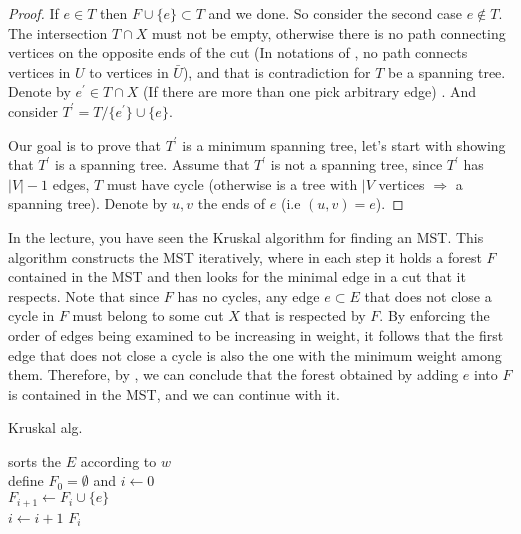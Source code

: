 \begin{proof}
  If $e \in T$ then $F \cup \{ e \} \subset T$ and we done. So consider the second case $ e \notin{T} $. The intersection $T\cap X$ must not be empty, otherwise there is no path connecting vertices on the opposite ends of the cut (In notations of , no path connects vertices in $U$ to vertices in $\bar{U}$), and that is contradiction for $T$ be a spanning tree. Denote by $e^{\prime} \in T \cap X$ (If there are more than one pick arbitrary edge) . And consider $T^{\prime} = T / \{e^{\prime}\} \cup \{e\}$.

  Our goal is to prove that $T^{\prime}$ is a minimum spanning tree, let's start with showing that $T^{\prime}$ is a spanning tree. Assume that $T^{\prime}$ is not a spanning tree, since $T^{\prime}$ has $|V|-1$ edges, $T$ must have cycle (otherwise is a tree with $|V$ vertices $\Rightarrow$ a spanning tree). Denote by $u,v$ the ends of $e$ (i.e $(u,v) = e$).   
\end{proof}


In the lecture, you have seen the Kruskal algorithm for finding an MST. This algorithm constructs the MST iteratively, where in each step it holds a forest $F$ contained in the MST and then looks for the minimal edge in a cut that it respects. Note that since $F$ has no cycles, any edge $e \subset E$ that does not close a cycle in $F$ must belong to some cut $X$ that is respected by $F$. By enforcing the order of edges being examined to be increasing in weight, it follows that the first edge that does not close a cycle is also the one with the minimum weight among them. Therefore, by , we can conclude that the forest obtained by adding $e$ into $F$ is contained in the MST, and we can continue with it.

\begin{algorithm}
\SetAlgoLined
{}
\caption{ Kruskal alg.}
sorts the $E$ according to $w$ \\
define $F_{0} = \emptyset$ and $i \leftarrow 0$ \\
 {
   {
    $F_{i+1} \leftarrow F_{i} \cup \{e\}$ \\
    $i \leftarrow i + 1$
  }
}
\Return $F_{i}$
\end{algorithm}




